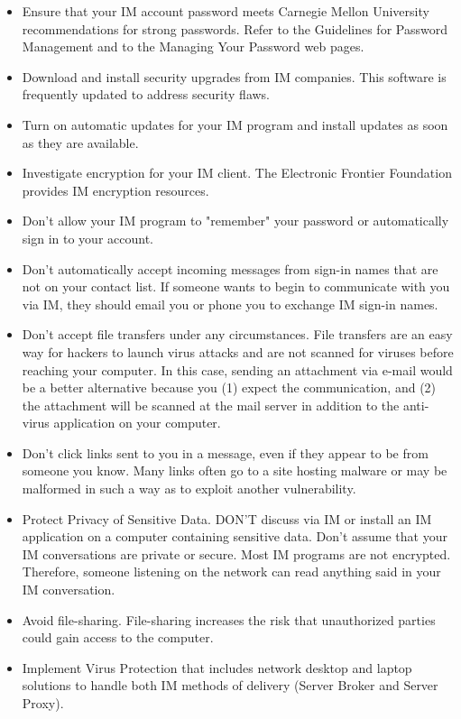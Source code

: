 \begin{itemize}
    \item Ensure that your IM account password meets Carnegie Mellon University recommendations for strong passwords.
    Refer to the Guidelines for Password Management and to the Managing Your Password web pages.
    \item Download and install security upgrades from IM companies.
    This software is frequently updated to address security flaws.
    \item Turn on automatic updates for your IM program and install updates as soon as they are available.
    \item Investigate encryption for your IM client.
    The Electronic Frontier Foundation provides IM encryption resources.
    \item Don't allow your IM program to "remember" your password or automatically sign in to your account.
    \item Don't automatically accept incoming messages from sign-in names that are not on your contact list.
    If someone wants to begin to communicate with you via IM, they should email you or phone you to exchange IM sign-in names.
    \item Don't accept file transfers under any circumstances.
    File transfers are an easy way for hackers to launch virus attacks and are not scanned for viruses before reaching your computer.
    In this case, sending an attachment via e-mail would be a better alternative because you (1) expect the communication, and (2)
    the attachment will be scanned at the mail server in addition to the anti-virus application on your computer.
    \item Don't click links sent to you in a message, even if they appear to be from someone you know.
    Many links often go to a site hosting malware or may be malformed in such a way as to exploit another vulnerability.
    \item Protect Privacy of Sensitive Data.
    DON'T discuss via IM or install an IM application on a computer containing sensitive data.
    Don’t assume that your IM conversations are private or secure.
    Most IM programs are not encrypted.
    Therefore, someone listening on the network can read anything said in your IM conversation.
    \item Avoid file-sharing.
    File-sharing increases the risk that unauthorized parties could gain access to the computer.
    \item Implement Virus Protection that includes network desktop and laptop solutions to handle both IM methods of delivery
    (Server Broker and Server Proxy).
\end{itemize}

